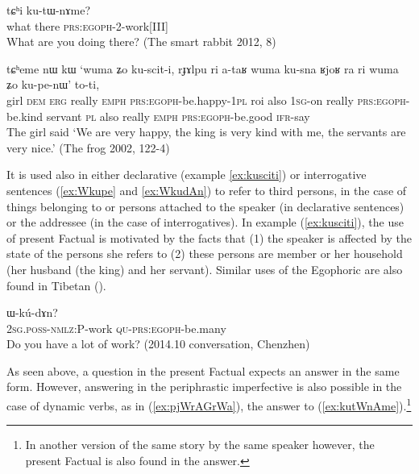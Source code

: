 \documentclass[oldfontcommands,oneside,a4paper,11pt]{article}
\newcommand{\ipa}[1]{{\phon \mbox{#1}}} %
\newcommand{\refb}[1]{(\ref{#1})}
\begin{document}
\begin{exe}
\ex \label{ex:kutWnAme}
\gll \ipa{nɯtɕu}  \ipa{tɕʰi} \ipa{ku-tɯ-nɤme?}\\
what there \textsc{prs:egoph}-2-work[III] \\
\glt What are you doing there? (The smart rabbit 2012, 8)
\end{exe}
 
 
\begin{exe}
\ex \label{ex:kusciti}
\gll
\ipa{tɕʰeme} 	\ipa{nɯ} 	\ipa{kɯ} 	\ipa{`wuma} 	\ipa{ʑo} 	\ipa{ku-scit-i,} \ipa{rɟɤlpu} 	\ipa{ri} 	\ipa{a-taʁ} 	\ipa{wuma} 	\ipa{ku-sna} \ipa{ʁjoʁ} 	\ipa{ra} 	\ipa{ri} 	\ipa{wuma} 	\ipa{ʑo} 	\ipa{ku-pe-nɯ'} \ipa{to-ti,} \\
girl \textsc{dem} \textsc{erg} really \textsc{emph} \textsc{prs:egoph}-be.happy-\textsc{1pl}  roi also \textsc{1sg}-on really \textsc{prs:egoph}-be.kind servant \textsc{pl} also really \textsc{emph}   \textsc{prs:egoph}-be.good \textsc{ifr}-say \\
\glt The girl said `We are very happy, the king is very kind with me, the servants are very nice.'
(The frog 2002, 122-4)
\end{exe}

It is used also in either declarative (example \ref{ex:kusciti}) or  interrogative sentences (\ref{ex:Wkupe} and \ref{ex:WkudAn}) to refer to third persons, in the case of things belonging to or persons attached to the speaker (in declarative sentences) or the addressee (in the case of interrogatives). In example \refb{ex:kusciti}, the use of present Factual is motivated by the facts that (1) the speaker is affected by the state of the persons she refers to (2) these persons are member or her household (her husband (the king) and her servant). Similar uses of the Egophoric are also found in Tibetan (\citealt[297]{tournadre08conjunct}).

 
  \begin{exe}
\ex \label{ex:WkudAn}
\gll \ipa{nɤ-kɤ-nɤma} 	\ipa{ɯ-kú-dɤn?}  \\
 \textsc{2sg.poss-nmlz:P}-work \textsc{qu-prs:egoph}-be.many \\
\glt Do you have a lot of work? (2014.10 conversation, Chenzhen)
\end{exe}

As seen above, a question in the present Factual expects an answer in the same form. However, answering in the periphrastic imperfective is also possible in the case of dynamic verbs, as in \refb{ex:pjWrAGrWa}, the answer to \refb{ex:kutWnAme}.\footnote{In another version of the same story by the same speaker however, the present Factual is also found in the answer.}
\end{document}
